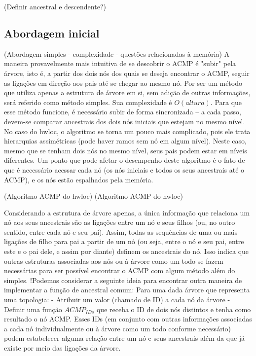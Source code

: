 \documentclass{ufsc-thesis}
\begin{document}
(Definir ancestral e descendente?)

\subsection{Abordagem inicial}

(Abordagem simples - complexidade - questões relacionadas à memória)
A maneira provavelmente mais intuitiva de se descobrir o ACMP é "subir" pela árvore, isto é, a partir dos dois nós dos quais se deseja encontrar o ACMP,
seguir as ligações em direção aos pais até se chegar ao mesmo nó.
Por ser um método que utiliza apenas a estrutura de árvore em si, sem adição de outras informações, será referido como método simples.
Sua complexidade é $O(altura)$.
Para que esse método funcione, é necessário subir de forma sincronizada -- a cada passo, devem-se comparar ancestrais dos dois nós iniciais que estejam no mesmo nível.
No caso do hwloc, o algoritmo se torna um pouco mais complicado, pois ele trata hierarquias assimétricas (pode haver ramos sem nó em algum nível).
Neste caso, mesmo que se tenham dois nós no mesmo nível, seus pais podem estar em níveis diferentes.
Um ponto que pode afetar o desempenho deste algoritmo é o fato de que é necessário acessar cada nó
(os nós iniciais e todos os seus ancestrais até o ACMP), e os nós estão espalhados pela memória.

(Algoritmo ACMP do hwloc)
(Algoritmo ACMP do hwloc)

Considerando a estrutura de árvore apenas, a única informação que relaciona um nó aos seus ancestrais
são as ligações entre um nó e seus filhos (ou, no outro sentido, entre cada nó e seu pai).
Assim, todas as sequências de uma ou mais ligações de filho para pai a partir de um nó (ou seja,
entre o nó e seu pai, entre este e o pai dele, e assim por diante) definem os ancestrais do nó.
Isso indica que outras estruturas associadas aos nós ou à árvore como um todo se fazem necessárias
para ser possível encontrar o ACMP com algum método além do simples.
!Podemos considerar a seguinte ideia para encontrar outra maneira de implementar a função de ancestral comum:
Para uma dada árvore que representa uma topologia:
- Atribuir um valor (chamado de ID) a cada nó da árvore
- Definir uma função $ACMP_{IDs}$ que receba o ID de dois nós distintos e tenha como resultado o nó ACMP.
Esses IDs (em conjunto com outras informações associadas a cada nó individualmente ou à árvore como um todo conforme necessário)
podem estabelecer alguma relação entre um nó e seus ancestrais além da que já existe por meio das ligações da árvore.
\end{document}
